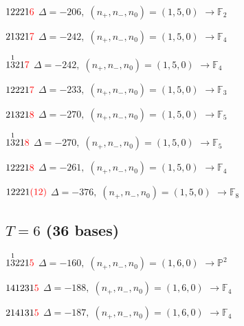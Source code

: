\documentclass[10pt]{article}
\begin{document}
\smallskip

$12221\textcolor{red}{6}$ \quad $\Delta=-206,\; (n_+,n_-,n_0)=(1,5,0)$ \quad $\to \mathbb{F}_{2}$

\smallskip

$21321\textcolor{red}{7}$ \quad $\Delta=-242,\; (n_+,n_-,n_0)=(1,5,0)$ \quad $\to \mathbb{F}_{4}$

\smallskip

$1\overset{1}{3}21\textcolor{red}{7}$ \quad $\Delta=-242,\; (n_+,n_-,n_0)=(1,5,0)$ \quad $\to \mathbb{F}_{4}$

\smallskip

$12221\textcolor{red}{7}$ \quad $\Delta=-233,\; (n_+,n_-,n_0)=(1,5,0)$ \quad $\to \mathbb{F}_{3}$

\smallskip

$21321\textcolor{red}{8}$ \quad $\Delta=-270,\; (n_+,n_-,n_0)=(1,5,0)$ \quad $\to \mathbb{F}_{5}$

\smallskip

$1\overset{1}{3}21\textcolor{red}{8}$ \quad $\Delta=-270,\; (n_+,n_-,n_0)=(1,5,0)$ \quad $\to \mathbb{F}_{5}$

\smallskip

$12221\textcolor{red}{8}$ \quad $\Delta=-261,\; (n_+,n_-,n_0)=(1,5,0)$ \quad $\to \mathbb{F}_{4}$

$12221\textcolor{red}{(12)}$ \quad $\Delta=-376,\; (n_+,n_-,n_0)=(1,5,0)$ \quad $\to \mathbb{F}_{8}$


\subsection*{$T = 6$ \quad (36 bases)}
\smallskip

$1\overset{1}{3}221\textcolor{red}{5}$ \quad $\Delta=-160,\; (n_+,n_-,n_0)=(1,6,0)$ \quad $\to \mathbb{P}^2$

\smallskip

$141231\textcolor{red}{5}$ \quad $\Delta=-188,\; (n_+,n_-,n_0)=(1,6,0)$ \quad $\to \mathbb{F}_{4}$

\smallskip

$214131\textcolor{red}{5}$ \quad $\Delta=-187,\; (n_+,n_-,n_0)=(1,6,0)$ \quad $\to \mathbb{F}_{4}$
\end{document}
